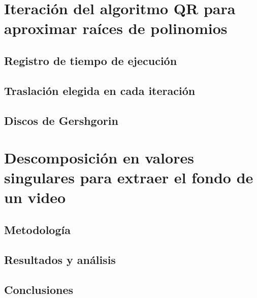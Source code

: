 \documentclass[12pt]{article}
\begin{document}
\section{Iteración del algoritmo QR para aproximar raíces de polinomios}


\subsection{Registro de tiempo de ejecución}

\subsection{Traslación elegida en cada iteración}

\subsection{Discos de Gershgorin}

\vspace{2cm}

\section{Descomposición en valores singulares para extraer el fondo de un video}


\subsection{Metodología}

\subsection{Resultados y análisis}

\subsection{Conclusiones}

\end{document}

